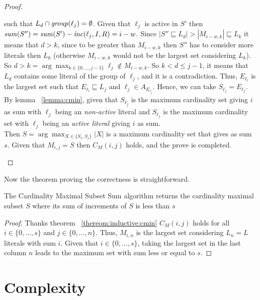 \begin{proof}
\begin{itemize}
\begin{itemize}
            such that $L_d \cap \mathit{group}(\ell_j) = \emptyset$.
            Given that $\ell_j$ is active in $S'$ then $\mathit{sum}(S'') = \mathit{sum}(S') - \mathit{inc}(\ell_j,I,R) = i - w$.
            Since $|S'' \sqsubseteq L_d| > |M_{i-w,k}| \sqsubseteq L_k $ it means that
            $d > k$, since to be greater than $M_{i-w,k}$ then $S''$ 
            has to consider more literals then $L_k$ (otherwise $M_{i-w,k}$ would not be the largest set considering $L_k$).
            So $d > k = \arg \max_{k \in \{0,\hdots,j-1\}} \ell_j \not\in M_{i-w,k}$.
            So $k < d \le j-1$, it means that $L_d$ contains some literal of the group of $\ell_j$,
            and it is a contradiction.
            Thus, $E_{\ell_l}$ is the largest set such that $E_{\ell_l} \sqsubseteq L_j$ and $\ell_j \in A_{E_{\ell_j}}$.
            Hence, we can take $S_{\ell_j} = E_{\ell_j}$.
            By lemma ~\ref{lemma:cmin}, given that $S_{\overline{\ell_j}}$ is the maximum cardinality set giving $i$ as sum with $\ell_j$ 
            being an \textit{non-active} literal
            and $S_{\ell_j}$ is the maximum cardinality set with $\ell_j$ being an \textit{active literal} giving $i$  as sum.\\
            Then $S = \arg\max_{X \in \{S_{\ell}, S_{\overline{\ell}}\}} |X|$  is a maximum cardinality set that gives as sum $s$.
            Given that $M_{i,j} = S$ then $C_M(i,j)$ holds, and the prove is completed.
    \end{itemize}
   \end{itemize}
\end{proof}

Now the theorem proving the correctness is straightforward.
\begin{theorem}
    \label{theorem:cardinality:maximal}
    The Cardinality Maximal Subset Sum algorithm returns the cardinality maximal subset $S$ where its sum 
    of increments of $S$ is less than $s$
\end{theorem}

\begin{proof}
    Thanks theorem ~\ref{thereom:inductive:cmin} $C_M(i,j)$ holds for all $i \in \{0, \hdots, s\}$
    and $j \in \{0, \hdots, n\}$.
    Thus, $M_{i,n}$ is the largest set considering $L_n = L$ literals with sum $i$.
    Given that $i \in \{0, \hdots, s\}$, taking the largest set in the last column $n$ leads to the maximum set with sum less or equal 
    to $s$.
\end{proof}

\section{Complexity}
\label{sec:complexity}
